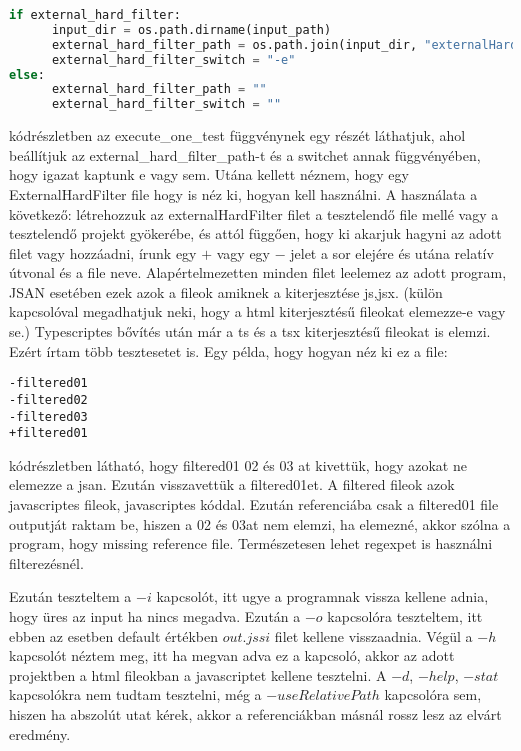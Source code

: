 \begin{lstlisting}[caption={JSAN kapcsoló beállítása pythonban}, label={lst:python_kapcsolo_beallitasa}, language={Python}]
if external_hard_filter:
      input_dir = os.path.dirname(input_path)
      external_hard_filter_path = os.path.join(input_dir, "externalHardFilter.txt")
      external_hard_filter_switch = "-e"
else:
      external_hard_filter_path = ""
      external_hard_filter_switch = ""
\end{lstlisting}

 kódrészletben az execute\_one\_test függvénynek egy részét láthatjuk, ahol beállítjuk az external\_hard\_filter\_path-t és a switchet annak függvényében, hogy igazat kaptunk e vagy sem.
Utána kellett néznem, hogy egy ExternalHardFilter file hogy is néz ki, hogyan kell használni.
A használata a következő: létrehozzuk az externalHardFilter filet a tesztelendő file mellé vagy a tesztelendő projekt gyökerébe,
és attól függően, hogy ki akarjuk hagyni az adott filet vagy hozzáadni, írunk egy $+$ vagy egy $-$ jelet a sor elejére és utána relatív útvonal és a file neve.
Alapértelmezetten minden filet leelemez az adott program, JSAN esetében ezek azok a fileok amiknek a kiterjesztése js,jsx. (külön kapcsolóval megadhatjuk neki, hogy a html kiterjesztésű fileokat elemezze-e vagy se.)
Typescriptes bővítés után már a ts és a tsx kiterjesztésű fileokat is elemzi. Ezért írtam több tesztesetet is. Egy példa, hogy hogyan néz ki ez a file:

\begin{lstlisting}[caption={ExternalHardFilter file}, label={lst:external_hard_filter}]
-filtered01
-filtered02
-filtered03
+filtered01
\end{lstlisting}

 kódrészletben látható, hogy filtered01 02 és 03 at kivettük, hogy azokat ne elemezze a jsan.
Ezután visszavettük a filtered01et. A filtered fileok azok javascriptes fileok, javascriptes kóddal.
Ezután referenciába csak a filtered01 file outputját raktam be, hiszen a 02 és 03at nem elemzi, ha elemezné, akkor szólna a program, hogy missing reference file.
Természetesen lehet regexpet is használni filterezésnél.

\noindent

Ezután teszteltem a $-i$ kapcsolót, itt ugye a programnak vissza kellene adnia, hogy üres az input ha nincs megadva.
Ezután a $-o$ kapcsolóra teszteltem, itt ebben az esetben default értékben $out.jssi$ filet kellene visszaadnia.
Végül a $-h$ kapcsolót néztem meg, itt ha megvan adva ez a kapcsoló, akkor az adott projektben a html fileokban a javascriptet kellene tesztelni.
A $-d$, $-help$, $-stat$ kapcsolókra nem tudtam tesztelni, még a $-useRelativePath$ kapcsolóra sem, hiszen ha abszolút utat kérek, akkor a referenciákban másnál rossz lesz az elvárt eredmény.

